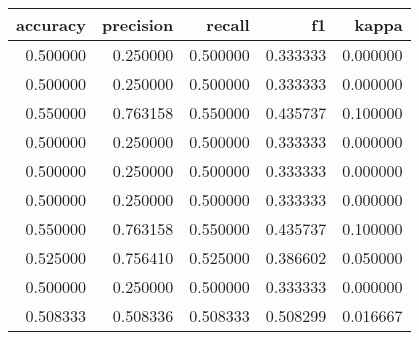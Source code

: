 \begin{tabular}{rrrrr}
\toprule
accuracy & precision & recall & f1 & kappa \\
\midrule
0.500000 & 0.250000 & 0.500000 & 0.333333 & 0.000000 \\
0.500000 & 0.250000 & 0.500000 & 0.333333 & 0.000000 \\
0.550000 & 0.763158 & 0.550000 & 0.435737 & 0.100000 \\
0.500000 & 0.250000 & 0.500000 & 0.333333 & 0.000000 \\
0.500000 & 0.250000 & 0.500000 & 0.333333 & 0.000000 \\
0.500000 & 0.250000 & 0.500000 & 0.333333 & 0.000000 \\
0.550000 & 0.763158 & 0.550000 & 0.435737 & 0.100000 \\
0.525000 & 0.756410 & 0.525000 & 0.386602 & 0.050000 \\
0.500000 & 0.250000 & 0.500000 & 0.333333 & 0.000000 \\
0.508333 & 0.508336 & 0.508333 & 0.508299 & 0.016667 \\
\bottomrule
\end{tabular}
